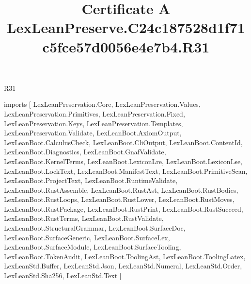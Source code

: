 \begin{lexlean}{R31}
\title{Certificate A LexLeanPreserve.C24c187528d1f71c5fce57d0056e4e7b4.R31}
\begin{coremodule}
imports [
  LexLeanPreservation.Core,
  LexLeanPreservation.Values,
  LexLeanPreservation.Primitives,
  LexLeanPreservation.Fixed,
  LexLeanPreservation.Keys,
  LexLeanPreservation.Templates,
  LexLeanPreservation.Validate,
  LexLeanBoot.AxiomOutput,
  LexLeanBoot.CalculusCheck,
  LexLeanBoot.CliOutput,
  LexLeanBoot.ContentId,
  LexLeanBoot.Diagnostics,
  LexLeanBoot.GnafValidate,
  LexLeanBoot.KernelTerms,
  LexLeanBoot.LexiconLre,
  LexLeanBoot.LexiconLse,
  LexLeanBoot.LockText,
  LexLeanBoot.ManifestText,
  LexLeanBoot.PrimitiveScan,
  LexLeanBoot.ProjectText,
  LexLeanBoot.RuntimeValidate,
  LexLeanBoot.RustAssemble,
  LexLeanBoot.RustAst,
  LexLeanBoot.RustBodies,
  LexLeanBoot.RustLoops,
  LexLeanBoot.RustLower,
  LexLeanBoot.RustMoves,
  LexLeanBoot.RustPackage,
  LexLeanBoot.RustPrint,
  LexLeanBoot.RustSucceed,
  LexLeanBoot.RustTerms,
  LexLeanBoot.RustValidate,
  LexLeanBoot.StructuralGrammar,
  LexLeanBoot.SurfaceDoc,
  LexLeanBoot.SurfaceGeneric,
  LexLeanBoot.SurfaceLex,
  LexLeanBoot.SurfaceModule,
  LexLeanBoot.SurfaceTooling,
  LexLeanBoot.TokenAudit,
  LexLeanBoot.ToolingAst,
  LexLeanBoot.ToolingLatex,
  LexLeanStd.Buffer,
  LexLeanStd.Json,
  LexLeanStd.Numeral,
  LexLeanStd.Order,
  LexLeanStd.Sha256,
  LexLeanStd.Text
]


\end{coremodule}
\end{lexlean}
